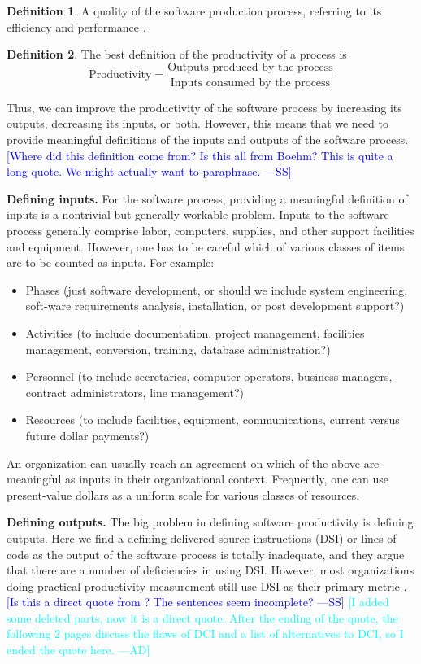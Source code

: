 \documentclass[letterpaper,cleveref]{lipics-v2019}
\newcommand{\authornote}[3]{\textcolor{#1}{[#3 ---#2]}}
\newcommand{\authornote}[3]{}
\newcommand{\wss}[1]{\authornote{blue}{SS}{#1}} %
\newcommand{\ad}[1]{\authornote{cyan}{AD}{#1}} %
\theoremstyle{definition}
\newtheorem{defn}{Definition}
\begin{document}
\begin{defn}
  A quality of the software production process, referring to its efficiency and
  performance \citep{ghezzi1991fundamentals}.
\end{defn}
\begin{defn}
  The best definition of the productivity of a process is
	\[\text{Productivity} = \dfrac{\text{Outputs produced by the
              process}}{\text{Inputs consumed by the process}}\]

Thus, we can improve the productivity of the software process by increasing its
outputs, decreasing its inputs, or both. However, this means that we need to
provide meaningful definitions of the inputs and outputs of the software
process. \wss{Where did this definition come from?  Is this all from Boehm?
  This is quite a long quote.  We might actually want to paraphrase.}

\textbf{Defining inputs.} For the software process, providing a meaningful
definition of inputs is a nontrivial but generally workable problem. Inputs to
the software process generally comprise labor, computers, supplies, and other
support facilities and equipment. However, one has to be careful which of
various classes of items are to be counted as inputs. For example:
\begin{itemize}
\item Phases (just software development, or should we include system
engineering, soft-ware requirements analysis, installation, or post development
support?)
\item Activities (to include documentation, project management, facilities
management, conversion, training, database administration?)
\item Personnel (to include secretaries, computer operators, business managers,
contract administrators, line management?)
\item Resources (to include facilities, equipment, communications, current
versus future dollar payments?)
\end{itemize}
An organization can usually reach an agreement on which of the above are
meaningful as inputs in their organizational context. Frequently, one can use
present-value dollars as a uniform scale for various classes of resources.

\textbf{Defining outputs.} The big problem in defining software productivity is
defining outputs. Here we find a defining delivered source instructions (DSI) or
lines of code as the output of the software process is totally inadequate, and
they argue that there are a number of deficiencies in using DSI. However,
	most organizations doing practical productivity measurement still use DSI as
	their primary metric \citep{Boehm1987}. \wss{Is this a direct quote from
		\citet{Boehm1987}?  The sentences seem incomplete?}
\ad{I added some deleted parts, now it is a direct quote. After the ending of
the quote, the following 2 pages discuss the flaws of DCI and a list of
alternatives to DCI, so I ended the quote here.}
\end{defn}
\end{document}

